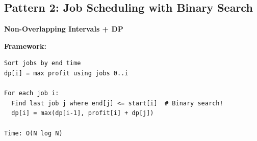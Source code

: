 \documentclass[11pt,a4paper,oneside]{book}
\begin{document}
\subsection{Pattern 2: Job Scheduling with Binary Search}

\begin{tcolorbox}[
    enhanced,breakable,
    colback=lightgray,
    colframe=accentorange,
    boxrule=2pt,
    arc=4mm,
    title=\textbf{Complete Job Scheduling Algorithms}
]
\textbf{Non-Overlapping Intervals + DP}

\textbf{Framework:}
\begin{verbatim}
Sort jobs by end time
dp[i] = max profit using jobs 0..i

For each job i:
  Find last job j where end[j] <= start[i]  # Binary search!
  dp[i] = max(dp[i-1], profit[i] + dp[j])

Time: O(N log N)
\end{verbatim}
\end{tcolorbox}
\end{document}
